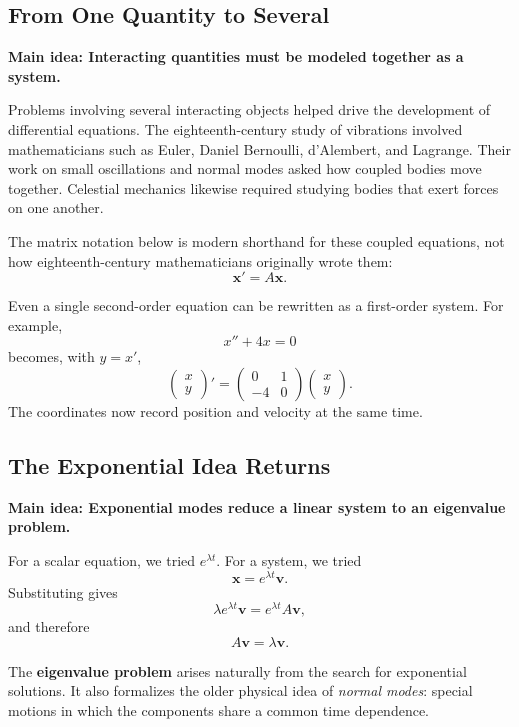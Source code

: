 \documentclass[11pt,letterpaper]{article}
\begin{document}
\subsection{From One Quantity to Several}

\textbf{Main idea: Interacting quantities must be modeled together as a system.}

Problems involving several interacting objects
helped drive the development of differential equations.
The eighteenth-century study of vibrations involved
mathematicians such as Euler, Daniel Bernoulli,
d'Alembert, and Lagrange. Their work on small
oscillations and normal modes asked how coupled bodies
move together. Celestial mechanics likewise required
studying bodies that exert forces on one another.

The matrix notation below is modern shorthand for
these coupled equations, not how eighteenth-century
mathematicians originally wrote them:
\[
\mathbf{x}'=A\mathbf{x}.
\]

Even a single second-order equation can be rewritten
as a first-order system. For example,
\[
x''+4x=0
\]
becomes, with $y=x'$,
\[
\begin{pmatrix}x\\y\end{pmatrix}'
=
\begin{pmatrix}
0&1\\
-4&0
\end{pmatrix}
\begin{pmatrix}x\\y\end{pmatrix}.
\]
The coordinates now record position and velocity
at the same time.

\subsection{The Exponential Idea Returns}

\textbf{Main idea: Exponential modes reduce a linear system to an eigenvalue problem.}

For a scalar equation, we tried $e^{\lambda t}$.
For a system, we tried
\[
\mathbf{x}=e^{\lambda t}\mathbf{v}.
\]
Substituting gives
\[
\lambda e^{\lambda t}\mathbf{v}
=e^{\lambda t}A\mathbf{v},
\]
and therefore
\[
\boxed{A\mathbf{v}=\lambda\mathbf{v}.}
\]

The \textbf{eigenvalue problem} arises naturally
from the search for exponential solutions. It also
formalizes the older physical idea of \emph{normal modes}:
special motions in which the components share a common
time dependence.
\end{document}
